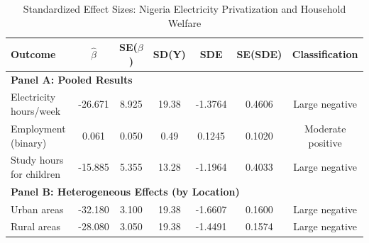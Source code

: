 \begin{table}[h!]
\centering
\caption{Standardized Effect Sizes: Nigeria Electricity Privatization and Household Welfare}
\label{tab:sde}
\small
\begin{tabular}{lcccccc}
\hline
Outcome & \(\hat{\beta}\) & SE(\(\beta\)) & SD(Y) & SDE & SE(SDE) & Classification \\
\hline
\multicolumn{7}{l}{\textbf{Panel A: Pooled Results}} \\
\hline
Electricity hours/week & -26.671 & 8.925 & 19.38 & -1.3764 & 0.4606 & Large negative \\
Employment (binary) & 0.061 & 0.050 & 0.49 & 0.1245 & 0.1020 & Moderate positive \\
Study hours for children & -15.885 & 5.355 & 13.28 & -1.1964 & 0.4033 & Large negative \\
\hline
\multicolumn{7}{l}{\textbf{Panel B: Heterogeneous Effects (by Location)}} \\
\hline
Urban areas & -32.180 & 3.100 & 19.38 & -1.6607 & 0.1600 & Large negative \\
Rural areas & -28.080 & 3.050 & 19.38 & -1.4491 & 0.1574 & Large negative \\
\hline
\end{tabular}
\vspace*{0.5cm}
\begin{itemize}

\end{itemize}
\end{table}
